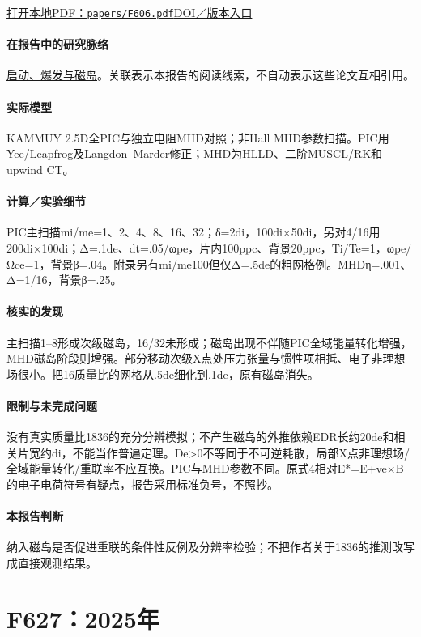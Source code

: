 \href{run:papers/F606.pdf}{打开本地PDF：\texttt{papers/F606.pdf}}\quad\href{https://doi.org/10.1063/5.0274477}{DOI／版本入口}

\paragraph{在报告中的研究脉络}\hyperref[story:onset]{启动、爆发与磁岛}。关联表示本报告的阅读线索，不自动表示这些论文互相引用。

\paragraph{实际模型}KAMMUY 2.5D全PIC与独立电阻MHD对照；非Hall MHD参数扫描。PIC用Yee/Leapfrog及Langdon–Marder修正；MHD为HLLD、二阶MUSCL/RK和upwind CT。

\paragraph{计算／实验细节}PIC主扫描mi/me=1、2、4、8、16、32；δ=2di，100di×50di，另对4/16用200di×100di；Δ=.1de、dt=.05/ωpe，片内100ppc、背景20ppc，Ti/Te=1，ωpe/Ωce=1，背景β=.04。附录另有mi/me100但仅Δ=.5de的粗网格例。MHDη=.001、Δ=1/16，背景β=.25。

\paragraph{核实的发现}主扫描1–8形成次级磁岛，16/32未形成；磁岛出现不伴随PIC全域能量转化增强，MHD磁岛阶段则增强。部分移动次级X点处压力张量与惯性项相抵、电子非理想场很小。把16质量比的网格从.5de细化到.1de，原有磁岛消失。

\paragraph{限制与未完成问题}没有真实质量比1836的充分分辨模拟；不产生磁岛的外推依赖EDR长约20de和相关片宽约di，不能当作普遍定理。De>0不等同于不可逆耗散，局部X点非理想场/全域能量转化/重联率不应互换。PIC与MHD参数不同。原式4相对E*=E+ve×B的电子电荷符号有疑点，报告采用标准负号，不照抄。

\paragraph{本报告判断}纳入磁岛是否促进重联的条件性反例及分辨率检验；不把作者关于1836的推测改写成直接观测结果。

\section{F627：2025年}\label{paper:F627}


